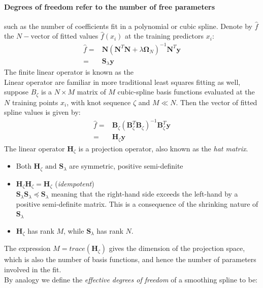 \paragraph{Degrees of freedom refer to the number of free parameters} such as
the number of coefficients fit in a polynomial or cubic spline. Denote by $\hat{f}$ the 
$N-\text{vector}$ of fitted values $\hat{f}(x_{i})$ at the training predictors $x_{i}$:
\begin{align*}
	\hat{f}=&\bm{N}\left(\bm{N}^{T}\bm{N}+\lambda\bm{\Omega}_{N}\right)^{-1}\bm{N}^{T}\bm{y}\\
	=& \bm{S}_{\lambda}\bm{y}
\end{align*}
The finite linear operator  is known as the \\
Linear operator are familiar in more traditional least squares fitting as well, suppose 
$B_{\zeta}$ is a $N\times M$ matrix of $M$ cubic-spline basis functions evaluated at the $N$
training points $x_{i}$, with knot sequence $\zeta$ and $M\ll N$. Then the vector of fitted spline
values is given by:
\begin{align*}
	\hat{f}=&\bm{B}_{\zeta}\left(\bm{B}_{\zeta}^{T}\bm{B}_{\zeta}\right)^{-1}\bm{B}_{\zeta}^{T}\bm{y}\\
	=& \bm{H}_{\zeta}\bm{y}
\end{align*}
The linear operator $\bm{H}_{\zeta}$ is a projection operator, also known as the \textit{hat 
matrix}.
\begin{itemize}
	\item Both $\bm{H}_{\zeta}\text{ and }\bm{S}_{\lambda}$ are symmetric, positive 
		semi-definite
	\item $\bm{H}_{\zeta}\bm{H}_{\zeta} = \bm{H}_{\zeta}$ (\textit{idempotent})\\
		$\bm{S}_{\lambda}\bm{S}_{\lambda}\preceq\bm{S}_{\lambda}$ 
		meaning that the right-hand side exceeds the left-hand by a positive semi-definite
		matrix. This is a consequence of the shrinking nature of $\bm{S}_{\lambda}$
	\item $\bm{H}_{\zeta}$ has rank $M$, while $\bm{S}_{\lambda}$ has rank $N$.
\end{itemize}
The expression $M = trace\left(\bm{H}_{\zeta}\right)$ gives the dimension of the projection
space, which is also the number of basis functions, and hence the number of parameters involved
in the fit. \\ By analogy we define the \textit{effective degrees of freedom} of a smoothing
spline to be: 

